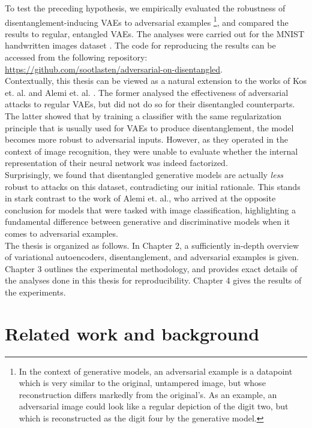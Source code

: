 \documentclass{report}
\begin{document}
\noindent To test the preceding hypothesis, we empirically evaluated the robustness of disentanglement-inducing VAEs to adversarial examples \footnote{In the context of generative models, an adversarial example is a datapoint which is very similar to the original, untampered image, but whose reconstruction differs markedly from the original's. As an example, an adversarial image could look like a regular depiction of the digit two, but which is reconstructed as the digit four by the generative model.}, and compared the results to regular, entangled VAEs. The analyses were carried out for the MNIST handwritten images dataset \cite{mnist}. The code for reproducing the results can be accessed from the following repository: \url{https://github.com/sootlasten/adversarial-on-disentangled}. \\

\noindent Contextually, this thesis can be viewed as a natural extension to the works of Kos et. al. \cite{kos-gen-adv} and Alemi et. al. \cite{deep-variational-bottleneck}. The former analysed the effectiveness of adversarial attacks to regular VAEs, but did not do so for their disentangled counterparts. The latter showed that by training a classifier with the same regularization principle that is usually used for VAEs to produce disentanglement, the model becomes more robust to adversarial inputs. However, as they operated in the context of image recognition, they were unable to evaluate whether the internal representation of their neural network was indeed factorized. \\

\noindent Surprisingly, we found that disentangled generative models are actually \textit{less} robust to attacks on this dataset, contradicting our initial rationale. This stands in stark contrast to the work of Alemi et. al., who arrived at the opposite conclusion for models that were tasked with image classification, highlighting a fundamental difference between generative and discriminative models when it comes to adversarial examples. \\

\noindent The thesis is organized as follows. In Chapter 2, a sufficiently in-depth overview of variational autoencoders, disentanglement, and adversarial examples is given. Chapter 3 outlines the experimental methodology, and provides exact details of the analyses done in this thesis for reproducibility. Chapter 4 gives the results of the experiments. 

\chapter{Related work and background}
\end{document}
